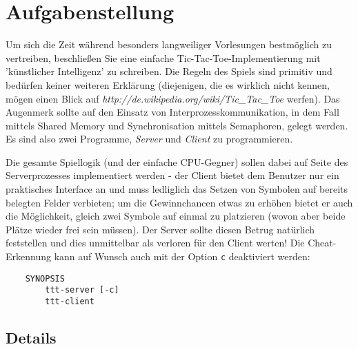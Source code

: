 




\section*{Aufgabenstellung}

Um sich die Zeit während besonders langweiliger Vorlesungen bestmöglich
zu vertreiben, beschließen Sie eine einfache Tic-Tac-Toe-Implementierung
mit 'künstlicher Intelligenz' zu schreiben. Die Regeln des Spiels sind
primitiv und bedürfen keiner weiteren Erklärung (diejenigen, die es wirklich nicht
kennen, mögen einen Blick auf \textit{http://de.wikipedia.org/wiki/Tic\_Tac\_Toe}
werfen). Das Augenmerk sollte auf den Einsatz von Interprozesskommunikation, in dem Fall 
mittels Shared Memory und Synchronisation mittels Semaphoren, gelegt werden. \\
Es sind also zwei Programme, \textit{Server} und \textit{Client} zu programmieren.

Die gesamte Spiellogik (und der einfache CPU-Gegner) sollen dabei auf Seite des 
Serverprozesses implementiert werden - der Client bietet dem Benutzer nur
ein praktisches Interface an und muss ledliglich das Setzen von Symbolen auf
bereits belegten Felder verbieten; um die Gewinnchancen etwas zu erhöhen bietet
er auch die Möglichkeit, gleich zwei Symbole auf einmal zu platzieren (wovon
aber beide Plätze wieder frei sein müssen). Der Server sollte diesen Betrug
natürlich feststellen und dies unmittelbar als verloren für den Client werten!
Die Cheat-Erkennung kann auf Wunsch auch mit der Option \texttt{c} deaktiviert
werden:

\begin{verbatim}
    SYNOPSIS
        ttt-server [-c]
        ttt-client 
\end{verbatim}

\subsection*{Details}
